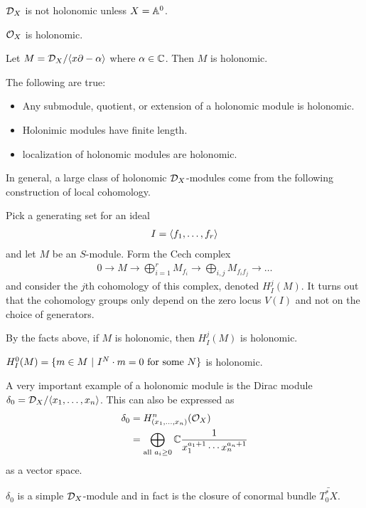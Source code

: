 \documentclass[12pt]{article}
\begin{document}
\begin{example}
    ${\mathcal{D}}_X$ is not holonomic unless $X = \mathbb{A}^0$.
\end{example}

\begin{example}
    ${\mathcal{O}}_X$ is holonomic.
\end{example}

\begin{example}
    Let $M = {\mathcal{D}}_X/\langle{x\partial - \alpha}\rangle$ where $\alpha\in \mathbb{C}$. Then $M$ is holonomic.
\end{example}

The following are true: \begin{itemize}
    \item Any submodule, quotient, or extension of a holonomic module is holonomic.
    \item Holonimic modules have finite length.
    \item localization of holonomic modules are holonomic.
\end{itemize}

In general, a large class of holonomic ${\mathcal{D}}_X$-modules come from the following construction
of local cohomology. 

\begin{definition}
    Pick a generating set for an ideal \begin{align*}
        I = \langle{f_1, \ldots, f_r}\rangle
    \end{align*} and let $M$ be an $S$-module. Form the Cech complex \begin{align*}
        0 \to M \to \bigoplus_{i=1}^r M_{f_i} \to \bigoplus_{i,j} M_{f_if_j} \to \ldots
    \end{align*} and consider the $j$th cohomology of this complex, denoted
    $H^j_I(M)$. It turns out that the cohomology groups only depend on the 
    zero locus $V(I)$ and not on the choice of generators.

    \hfill

    By the facts above, if $M$ is holonomic, then $H^j_I(M)$ is holonomic.
\end{definition}

\begin{example}
    $H^0_I(M) = \{m\in M \ \vert \  I^N\cdot m = 0 \text{ for some } N\}$ is holonomic.
\end{example}

\begin{example}
    A very important example of a holonomic module 
    is the Dirac module $\delta_0 = {\mathcal{D}}_X/\langle{x_1, \ldots, x_n}\rangle$. This can also be expressed as \begin{align*}
        \delta_0 &= H^n_{(x_1, \ldots, x_n)}({\mathcal{O}}_X) \\
        &= \bigoplus_{\text{all } a_i\geq 0} \mathbb{C} \frac{1}{x_1^{a_1 + 1}\cdots x_n^{a_n + 1}}
    \end{align*} as a vector space.

    \hfill 

    $\delta_0$ is a simple ${\mathcal{D}}_X$-module and in fact is the closure of conormal bundle 
    $\bar{T^*_{0}X}$.
\end{example}
\end{document}
